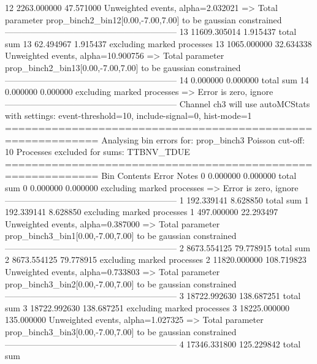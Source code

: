 12         2263.000000     47.571000       Unweighted events, alpha=2.032021
  => Total parameter prop_binch2_bin12[0.00,-7.00,7.00] to be gaussian constrained
------------------------------------------------------------
13         11609.305014    1.915437        total sum                     
13         62.494967       1.915437        excluding marked processes    
13         1065.000000     32.634338       Unweighted events, alpha=10.900756
  => Total parameter prop_binch2_bin13[0.00,-7.00,7.00] to be gaussian constrained
------------------------------------------------------------
14         0.000000        0.000000        total sum                     
14         0.000000        0.000000        excluding marked processes    
  => Error is zero, ignore      
------------------------------------------------------------
Channel ch3 will use autoMCStats with settings: event-threshold=10, include-signal=0, hist-mode=1
============================================================
Analysing bin errors for: prop_binch3
Poisson cut-off: 10
Processes excluded for sums: TTBNV_TDUE
============================================================
Bin        Contents        Error           Notes                         
0          0.000000        0.000000        total sum                     
0          0.000000        0.000000        excluding marked processes    
  => Error is zero, ignore      
------------------------------------------------------------
1          192.339141      8.628850        total sum                     
1          192.339141      8.628850        excluding marked processes    
1          497.000000      22.293497       Unweighted events, alpha=0.387000
  => Total parameter prop_binch3_bin1[0.00,-7.00,7.00] to be gaussian constrained
------------------------------------------------------------
2          8673.554125     79.778915       total sum                     
2          8673.554125     79.778915       excluding marked processes    
2          11820.000000    108.719823      Unweighted events, alpha=0.733803
  => Total parameter prop_binch3_bin2[0.00,-7.00,7.00] to be gaussian constrained
------------------------------------------------------------
3          18722.992630    138.687251      total sum                     
3          18722.992630    138.687251      excluding marked processes    
3          18225.000000    135.000000      Unweighted events, alpha=1.027325
  => Total parameter prop_binch3_bin3[0.00,-7.00,7.00] to be gaussian constrained
------------------------------------------------------------
4          17346.331800    125.229842      total sum                     

